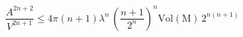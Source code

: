 \begin{equation}
\frac{A^{2n+2}}{V^{2n+1}} \le 4\pi(n+1)\lambda^n\,\left(\frac{n+1}{2^n}
 \right)^{n}\mathrm{Vol(M)} \,
2^{n(n+1)}\,\,
\end{equation}

